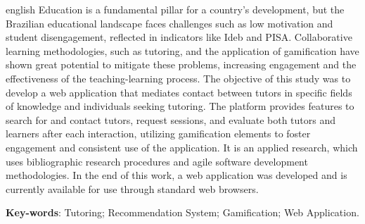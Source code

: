 \begin{resumo}[Abstract]
 \begin{otherlanguage*}{english}
    Education is a fundamental pillar for a country's development, but the Brazilian educational landscape faces challenges such as low motivation and student disengagement, reflected in indicators like Ideb and PISA. Collaborative learning methodologies, such as tutoring, and the application of gamification have shown great potential to mitigate these problems, increasing engagement and the effectiveness of the teaching-learning process. 
    The objective of this study was to develop a web application that mediates contact between tutors in specific fields of knowledge and individuals seeking tutoring. The platform provides features to search for and contact tutors, request sessions, and evaluate both tutors and learners after each interaction, utilizing gamification elements to foster engagement and consistent use of the application. It is an applied research, which uses bibliographic research procedures and agile software development methodologies. In the end of this work, a web application was developed and is currently available for use through standard web browsers.
   \vspace{\onelineskip}
 
   \noindent 
   \textbf{Key-words}: Tutoring; Recommendation System; Gamification; Web Application.
 \end{otherlanguage*}
\end{resumo}
